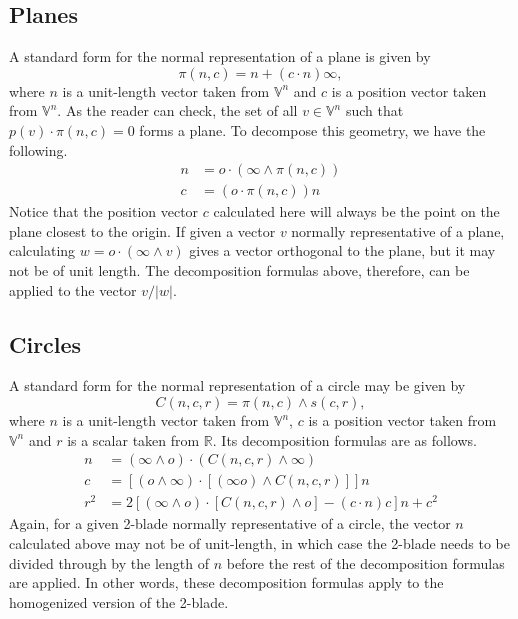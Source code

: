 \documentclass{article}
\newcommand{\R}{\mathbb{R}}
\newcommand{\V}{\mathbb{V}}
\newcommand{\nvao}{o}
\newcommand{\nvai}{\infty}
\begin{document}
\subsection{Planes}

A standard form for the normal representation of a plane is given by
\begin{equation*}
\pi(n,c) = n+(c\cdot n)\nvai,
\end{equation*}
where $n$ is a unit-length vector taken from $\V^n$ and $c$ is a position vector taken from $\V^n$.
As the reader can check, the set of all $v\in\V^n$ such that $p(v)\cdot\pi(n,c)=0$ forms a plane.
To decompose this geometry, we have the following.
\begin{align*}
n &= \nvao\cdot(\nvai\wedge\pi(n,c)) \\
c &= (\nvao\cdot\pi(n,c))n
\end{align*}
Notice that the position vector $c$ calculated here will always be the point on the plane
closest to the origin.  If given a vector $v$ normally representative of a plane,
calculating $w=\nvao\cdot(\nvai\wedge v)$ gives a vector orthogonal to the plane, but it
may not be of unit length.  The decomposition formulas above, therefore, can be applied
to the vector $v/|w|$.

\subsection{Circles}

A standard form for the normal representation of a circle may be given by
\begin{equation*}
C(n,c,r) = \pi(n,c)\wedge s(c,r),
\end{equation*}
where $n$ is a unit-length vector taken from $\V^n$, $c$ is a position vector taken from $\V^n$
and $r$ is a scalar taken from $\R$.  Its decomposition formulas are as follows.
\begin{align*}
n &= (\nvai\wedge\nvao)\cdot(C(n,c,r)\wedge\nvai) \\
c &= [(\nvao\wedge\nvai)\cdot[(\nvai\nvao)\wedge C(n,c,r)]]n \\
r^2 &= 2[(\nvai\wedge\nvao)\cdot[C(n,c,r)\wedge\nvao]-(c\cdot n)c]n+c^2
\end{align*}
Again, for a given 2-blade normally representative of a circle, the vector $n$
calculated above may not be of unit-length, in which case the 2-blade needs to
be divided through by the length of $n$ before the rest of the decomposition
formulas are applied.  In other words, these decomposition formulas apply to
the homogenized version of the 2-blade.
\end{document}
